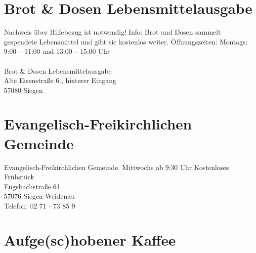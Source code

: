 \section{Brot \& Dosen Lebensmittelausgabe }
Nachweis über Hilfebezug ist notwendig! Info: Brot und Dosen sammelt gespendete Lebensmittel und gibt sie kostenlos weiter. Öffnungszeiten: Montags: 9:00 – 11:00 und 13:00 – 15:00 Uhr\\
\\
Brot \& Dosen Lebensmittelausgabe \\
Alte Eisenstraße 6., hinterer Eingang\\
57080 Siegen

\section{Evangelisch-Freikirchlichen Gemeinde}
Evangelisch-Freikirchlichen Gemeinde. Mittwochs ab 9:30 Uhr Kostenloses Frühstück \\
Engsbachstraße 61\\
57076 Siegen-Weidenau\\
Telefon: 02 71 - 73 85 9

\section{Aufge(sc)hobener Kaffee}

